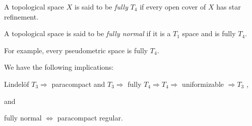 \documentclass[12pt]{article}
\begin{document}
A topological space $X$ is said to be \emph{fully} $T_4$ if every open cover of $X$ 
has star refinement.

A topological space is said to be \emph{fully normal} if it is a $T_1$ space and
is fully $T_4$.

For example, every pseudometric space is fully $T_4$.

We have the following implications:

Lindel\"of $T_3 \Rightarrow$ paracompact and $T_3 \Rightarrow$ fully $T_4 \Rightarrow T_4 \Rightarrow$ uniformizable $\Rightarrow T_3$ ,

and

fully normal $\Leftrightarrow$ paracompact regular.

\end{document}
